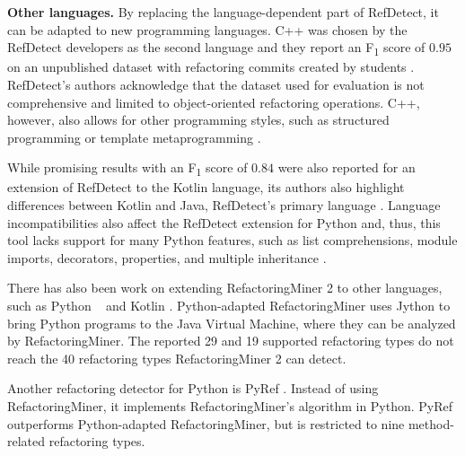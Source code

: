 \noindent\textbf{Other languages.} By replacing the language-dependent part of RefDetect, it can be adapted to new programming languages. C++ was chosen by the RefDetect developers as the second language and they report an F\textsubscript{1} score of $0.95$ on an unpublished dataset with refactoring commits created %
by students \cite{ieeeAccess21refdetect}. RefDetect's authors acknowledge that the dataset used for evaluation is not comprehensive and limited to object-oriented refactoring operations. C++, however, also allows for other programming styles, such as structured programming or template metaprogramming \cite{meyers05effectiveCpp}.

While promising results with an F\textsubscript{1} score of $0.84$ were also reported for an extension of RefDetect to the Kotlin language, its authors also highlight differences between Kotlin and Java, RefDetect's primary language \cite{saner24kotlinWithRefDetect}. Language incompatibilities also affect the RefDetect extension for Python and, thus, this tool lacks support for many Python features, such as list comprehensions, module imports, decorators, properties, and multiple inheritance \cite{bscThesis24pythonWithRefDetect}.

There has also been work on extending RefactoringMiner 2 to other languages, such as Python ~\cite{pythonAdaptedRefactoringMiner} and Kotlin \cite{ase21javaKotlinRefactoringInJetBrainsIde}. %
Python-adapted RefactoringMiner uses Jython to bring Python programs to the Java Virtual Machine, where they can be analyzed by RefactoringMiner. The reported 29 \cite{pythonAdaptedRefactoringMiner} %
and 19 \cite{ase21javaKotlinRefactoringInJetBrainsIde} supported refactoring types do not reach the 40 refactoring types RefactoringMiner 2 can detect.

Another refactoring detector for Python is PyRef \cite{pyref}. Instead of using RefactoringMiner, it implements RefactoringMiner's algorithm in Python. PyRef outperforms Python-adapted RefactoringMiner, but is restricted to nine method-related refactoring types.

